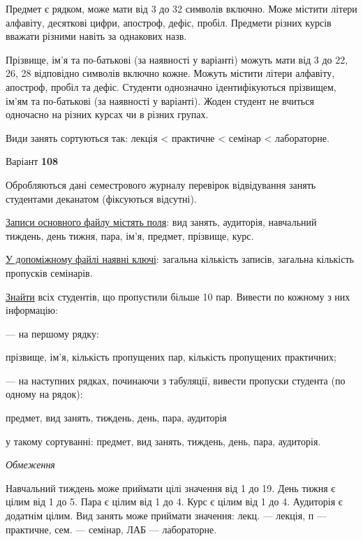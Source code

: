 \documentclass[11pt, ukrainian]{article}
\begin{document}
Предмет є рядком, може мати від 3 до 32 символів включно.
Може містити літери алфавіту, десяткові цифри, апостроф, дефіс, пробіл.
Предмети різних курсів вважати різними навіть за однакових назв.

Прізвище, ім’я та по-батькові (за наявності у варіанті)
можуть мати від 3 до 22, 26, 28 відповідно символів включно кожне.
Можуть містити літери алфавіту, апостроф, пробіл та дефіс.
Студенти однозначно ідентифікуються прізвищем, ім’ям та по-батькові (за наявності у варіанті).
Жоден студент не вчиться одночасно на різних курсах чи в різних групах.

Види занять сортуються так: лекція < практичне < семінар < лабораторне.





\par
\newpage
{\center Варіант  \No \textbf { 108 }\par}
\bigskip
Обробляються дані семестрового журналу перевірок відвідування занять студентами деканатом (фіксуються відсутні). 

\underline{Записи основного файлу містять поля}: вид занять, аудиторія, навчальний тиждень, день тижня, пара, ім’я, предмет, прізвище, курс.

\underline{У допоміжному файлі наявні ключі}: загальна кількість записів, загальна кількість пропусків семінарів.

\underline{Знайти} всіх студентів, що пропустили більше 10 пар. Вивести по кожному з них інформацію:\par
{\noindent}--- на першому рядку:\par
прізвище, ім’я, кількість пропущених пар, кількість пропущених практичних;

{\noindent}--- на наступних рядках, починаючи з табуляції, вивести пропуски студента (по одному на рядок):\par
предмет, вид занять, тиждень, день, пара, аудиторія

{\noindent}у такому сортуванні: предмет, вид занять, тиждень, день, пара, аудиторія.


\bigskip\textit{Обмеження}

Навчальний тиждень може приймати цілі значення від 1 до 19.
День тижня є цілим від 1 до 5. Пара є цілим від 1 до 4.
Курс є цілим від 1 до 4. Аудиторія є додатнім цілим.
Вид занять може приймати значення:
лекц. --- лекція, п --- практичне, сем. --- семінар, ЛАБ --- лабораторне.
\end{document}
